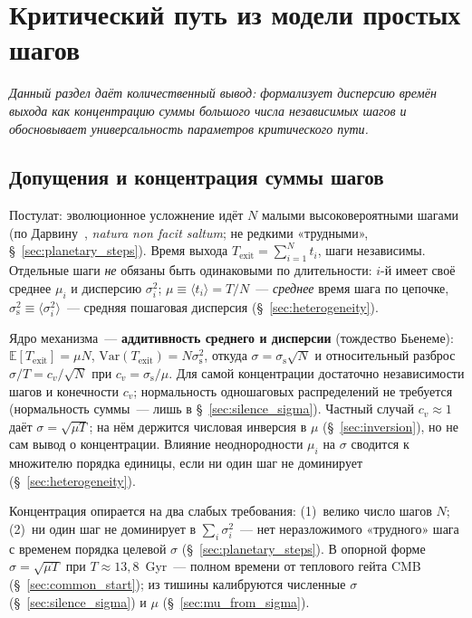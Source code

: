 \documentclass[12pt,a4paper]{article}
\begin{document}
\section{Критический путь из модели простых шагов}
\label{sec:steps}

\textit{Данный раздел даёт количественный вывод: формализует дисперсию времён выхода как концентрацию суммы большого числа независимых шагов и обосновывает универсальность параметров критического пути.}

\subsection{Допущения и концентрация суммы шагов}
\label{sec:concentration}

Постулат: эволюционное усложнение идёт $N$ малыми высоковероятными шагами (по Дарвину~\cite{Darwin1859}, \emph{natura non facit saltum}; не редкими «трудными», \S~\ref{sec:planetary_steps}). Время выхода $T_{\mathrm{exit}} = \sum_{i=1}^{N} t_i$, шаги независимы. Отдельные шаги \emph{не} обязаны быть одинаковыми по длительности: $i$-й имеет своё среднее $\mu_i$ и дисперсию $\sigma_i^2$; $\mu \equiv \langle t_i\rangle = T/N$~--- \emph{среднее} время шага по цепочке, $\sigma_{\mathrm{s}}^2 \equiv \langle\sigma_i^2\rangle$~--- средняя пошаговая дисперсия (\S~\ref{sec:heterogeneity}).

Ядро механизма~--- \textbf{аддитивность среднего и дисперсии} (тождество Бьенеме): $\mathbb{E}[T_{\mathrm{exit}}] = \mu N$, $\mathrm{Var}(T_{\mathrm{exit}}) = N\sigma_{\mathrm{s}}^2$, откуда $\sigma = \sigma_{\mathrm{s}}\sqrt{N}$ и относительный разброс $\sigma/T = c_v/\sqrt{N}$ при $c_v = \sigma_{\mathrm{s}}/\mu$. Для самой концентрации достаточно независимости шагов и конечности $c_v$; нормальность одношаговых распределений не требуется (нормальность суммы~--- лишь в \S~\ref{sec:silence_sigma}). Частный случай $c_v \approx 1$ даёт $\sigma = \sqrt{\mu T}$; на нём держится числовая инверсия в $\mu$ (\S~\ref{sec:inversion}), но не сам вывод о концентрации. Влияние неоднородности $\mu_i$ на $\sigma$ сводится к множителю порядка единицы, если ни один шаг не доминирует (\S~\ref{sec:heterogeneity}).

Концентрация опирается на два слабых требования: (1)~велико число шагов $N$; (2)~ни один шаг не доминирует в $\sum_i\sigma_i^2$~--- нет неразложимого «трудного» шага с временем порядка целевой $\sigma$ (\S~\ref{sec:planetary_steps}). В опорной форме $\sigma = \sqrt{\mu T}$ при $T \approx 13{,}8$~Gyr~--- полном времени от теплового гейта CMB (\S~\ref{sec:common_start}); из тишины калибруются численные $\sigma$ (\S~\ref{sec:silence_sigma}) и $\mu$ (\S~\ref{sec:mu_from_sigma}).
\end{document}
